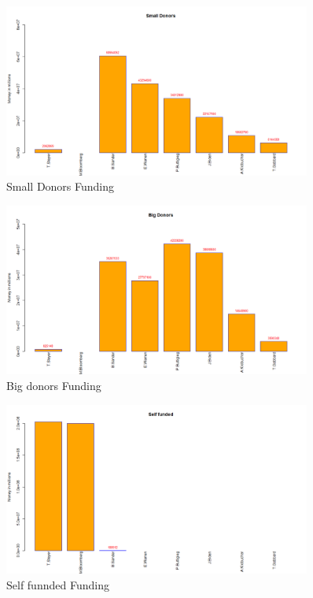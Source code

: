 \begin{figure}[H]
    \centering
    \includegraphics[width=0.9\textwidth]{figures/Small Donors.png}
    \caption{Small Donors Funding}
    \label{Small Donors}
\end{figure}

\begin{figure}[H]
    \centering
    \includegraphics[width=0.9\textwidth]{figures/Bigdonor.png}
    \caption{Big donors Funding}
    \label{Bigdonor}
\end{figure}

\begin{figure}[H]
    \centering
    \includegraphics[width=0.9\textwidth]{figures/Selffunnded.png}
    \caption{Self funnded Funding}
    \label{Selffunnded}
\end{figure}

